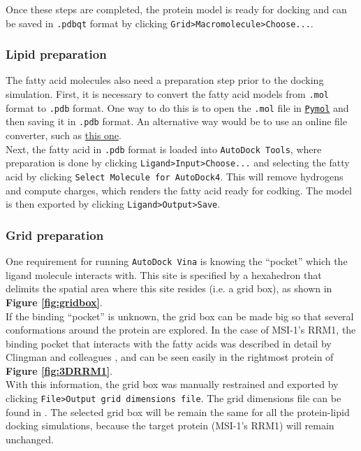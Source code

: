 Once these steps are completed, the protein model is ready for docking and can be saved in \texttt{.pdbqt} format by clicking \texttt{Grid>Macromolecule>Choose...}.

\subsubsection{Lipid preparation}

The fatty acid molecules also need a preparation step prior to the docking simulation. First, it is necessary to convert the fatty acid models from \texttt{.mol} format to \texttt{.pdb} format. One way to do this is to open the \texttt{.mol} file in \href{https://pymol.org/2/}{\texttt{Pymol}} and then saving it in \texttt{.pdb} format. An alternative way would be to use an online file converter, such as \href{https://datascience.unm.edu/tomcat/biocomp/convert}{this one}.\\

Next, the fatty acid in \texttt{.pdb} format is loaded into \texttt{AutoDock Tools}, where preparation is done by clicking \texttt{Ligand>Input>Choose...} and selecting the fatty acid by clicking \texttt{Select Molecule for AutoDock4}. This will remove hydrogens and compute charges, which renders the fatty acid ready for codking. The model is then exported by clicking \texttt{Ligand>Output>Save}.

\subsubsection{Grid preparation}

One requirement for running \texttt{AutoDock Vina} is knowing the ``pocket'' which the ligand molecule interacts with. This site is specified by a hexahedron that delimits the spatial area where this site resides (i.e. a grid box), as shown in \textbf{Figure \ref{fig:gridbox}}.\\

If the binding ``pocket'' is unknown, the grid box can be made big so that several conformations around the protein are explored. In the case of MSI-1's RRM1, the binding pocket that interacts with the fatty acids was described in detail by Clingman and colleagues \cite{clingman_2014}, and can be seen easily in the rightmost protein of \textbf{Figure \ref{fig:3DRRM1}}.\\

With this information, the grid box was manually restrained and exported by clicking \texttt{File>Output grid dimensions file}. The grid dimensions file can be found in \textbf{}. The selected grid box will be remain the same for all the protein-lipid docking simulations, because the target protein (MSI-1's RRM1) will remain unchanged.


